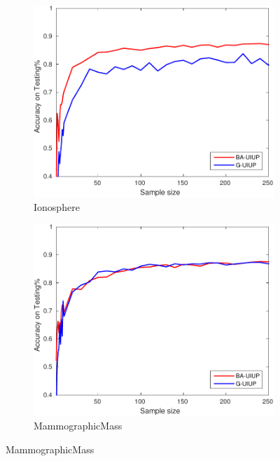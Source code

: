 \begin{figure}[ht]
\begin{subfigure}[b]{0.3\textwidth}
	\end{subfigure}
  \begin{subfigure}[b]{0.3\textwidth}
		\centering
  	\includegraphics[width=\textwidth]{figs/PLPTF/Trees/IonosphereDownsampledFurther_Trees_X_MH.pdf}
  	\caption{Ionosphere}
		\label{fig:I1}
	\end{subfigure}
  \begin{subfigure}[b]{0.3\textwidth}
		\centering
  	\includegraphics[width=\textwidth]{figs/PLPTF/Trees/MammographicMassDownsampled_Trees_X_MH.pdf}
  	\caption{MammographicMass}
		\label{fig:Mam1}
	\end{subfigure}

\end{figure}

